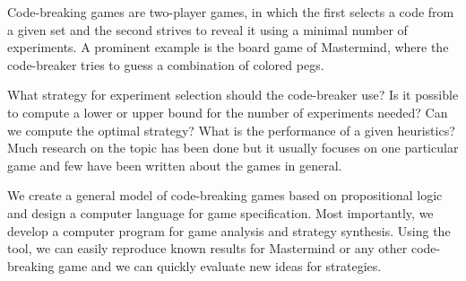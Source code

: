 \begin{ThesisAbstract}
Code-breaking games are two-player games, in which the first selects
  a code from a given set and the second strives to reveal it using a
  minimal number of experiments.
A prominent example is the board game of Mastermind,
  where the code-breaker tries to guess a combination of colored pegs.

What strategy for experiment selection should the code-breaker use?
Is it possible to compute a lower or upper bound for the number of experiments needed?
Can we compute the optimal strategy?
What is the performance of a given heuristics?
Much research on the topic has been done but it usually focuses
  on one particular game and few have been written about the games in general.

We create a general model of code-breaking games based on propositional logic
  and design a computer language for game specification.
Most importantly, we develop a computer program for game analysis
  and strategy synthesis.
Using the tool, we can easily reproduce known results for Mastermind or
  any other code-breaking game and we can quickly evaluate new ideas
  for strategies.
\end{ThesisAbstract}

\MainMatter
\setlength{\parindent}{0pt}

\setcounter{secnumdepth}{1}
\setcounter{tocdepth}{2}
\begin{spacing}{1.2} \normalsize
\tableofcontents
\end{spacing}










\pagestyle{plain}
\printbibheading
\printbibliography[keyword=cc,heading=subbibliography,title={Counterfeit Coin}]
\printbibliography[keyword=mm,heading=subbibliography,title={Mastermind}]
\printbibliography[keyword=other,heading=subbibliography,title={Other}]

